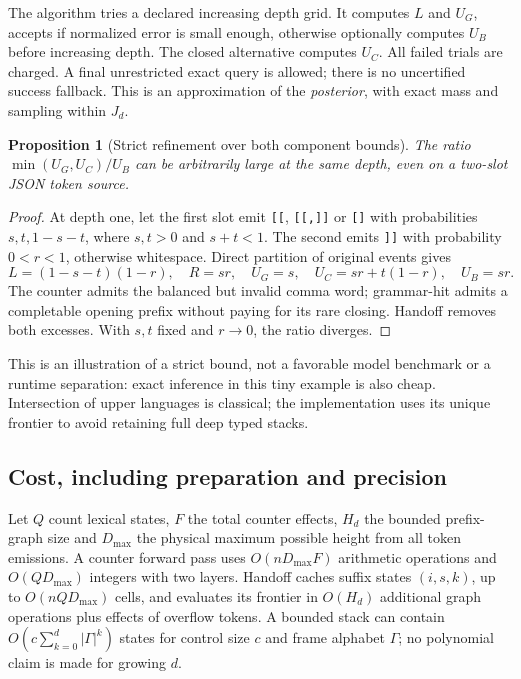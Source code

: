 \documentclass[12pt]{article}
\theoremstyle{readable}
\newtheorem{proposition}{Proposition}
\begin{document}
The algorithm tries a declared increasing depth grid. It computes $L$ and
$U_G$, accepts if normalized error is small enough, otherwise optionally
computes $U_B$ before increasing depth. The closed alternative computes $U_C$.
All failed trials are charged. A final unrestricted exact query is allowed;
there is no uncertified success fallback. This is an approximation of the
\emph{posterior}, with exact mass and sampling within $J_d$.

\begin{proposition}[Strict refinement over both component bounds]
The ratio $\min(U_G,U_C)/U_B$ can be arbitrarily large at the same depth,
even on a two-slot JSON token source.
\end{proposition}
\begin{proof}
At depth one, let the first slot emit \verb|[[|, \verb|[[,]]| or \verb|[]|
with probabilities $s,t,1-s-t$, where $s,t>0$ and $s+t<1$. The second
emits \verb|]]| with probability $0<r<1$, otherwise whitespace. Direct
partition of original events gives
\[
 L=(1-s-t)(1-r),\quad R=sr,\quad U_G=s,\quad
 U_C=sr+t(1-r),\quad U_B=sr.
\]
The counter admits the balanced but invalid comma word; grammar-hit admits
a completable opening prefix without paying for its rare closing. Handoff
removes both excesses. With $s,t$ fixed and $r\to0$, the ratio diverges.
\end{proof}
This is an illustration of a strict bound, not a favorable model benchmark
or a runtime separation: exact inference in this tiny example is also cheap.
Intersection of upper languages is classical; the implementation uses its
unique frontier to avoid retaining full deep typed stacks.

\subsection{Cost, including preparation and precision}

Let $Q$ count lexical states, $F$ the total counter effects, $H_d$ the bounded
prefix-graph size and $D_{\max}$ the physical maximum possible height from all
token emissions. A counter forward pass uses $O(nD_{\max}F)$ arithmetic
operations and $O(QD_{\max})$ integers with two layers. Handoff caches suffix
states $(i,s,k)$, up to $O(nQD_{\max})$ cells, and evaluates its frontier in
$O(H_d)$ additional graph operations plus effects of overflow tokens. A bounded
stack can contain $O(c\sum_{k=0}^d|\Gamma|^k)$ states for control size $c$ and
frame alphabet $\Gamma$; no polynomial claim is made for growing $d$.
\end{document}
